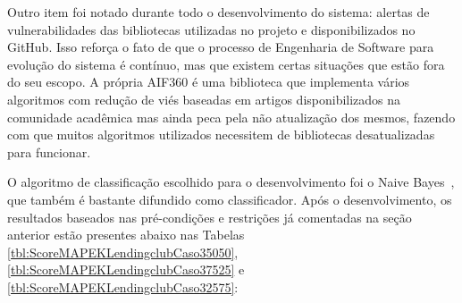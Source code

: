 \documentclass[portugues]{ic-tese}
\begin{document}
Outro item foi notado durante todo o desenvolvimento do sistema: alertas de vulnerabilidades das bibliotecas utilizadas no projeto e disponibilizados no GitHub. Isso reforça o fato de que o processo de Engenharia de Software para evolução do sistema é contínuo, mas que existem certas situações que estão fora do seu escopo. A própria AIF360 é uma biblioteca que implementa vários algoritmos com redução de viés baseadas em artigos disponibilizados na comunidade acadêmica mas ainda peca pela não atualização dos mesmos, fazendo com que muitos algoritmos utilizados necessitem de bibliotecas desatualizadas para funcionar.

O algoritmo de classificação escolhido para o desenvolvimento foi o Naive Bayes~\citep{Naive_Bayes_2004}, que também é bastante difundido como classificador. Após o desenvolvimento, os resultados baseados nas pré-condições e restrições já comentadas na seção anterior estão presentes abaixo nas Tabelas \ref{tbl:ScoreMAPEKLendingclubCaso35050}, \ref{tbl:ScoreMAPEKLendingclubCaso37525} e \ref{tbl:ScoreMAPEKLendingclubCaso32575}:

\begin{table}[H]
\begin{center}
  \caption{Melhores configurações escolhidas pelo Gerenciador Autonômico \\ Uso dos algoritmos implementados - 50\% Avaliação/50\% \textit{Fairness}}
\label{tbl:ScoreMAPEKLendingclubCaso35050}
\end{center}
\end{table}
\end{document}
